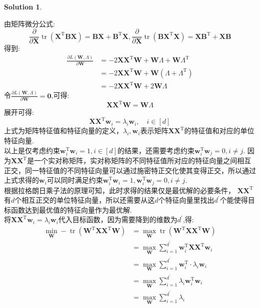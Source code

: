 \documentclass[a4paper,UTF8]{article}
\numberwithin{equation}{section}
\numberwithin{equation}{section}
\theoremstyle{definition}
\newtheorem*{solution}{Solution}
\begin{document}
\begin{solution}
\begin{enumerate}
        由矩阵微分公式:
        $$\frac{\partial}{\partial \mathbf{X}} \operatorname{tr}\left(\mathbf{X}^{\mathrm{T}} \mathbf{B} \mathbf{X}\right)=\mathbf{B} \mathbf{X}+\mathbf{B}^{\mathrm{T}} \mathbf{X}, \frac{\partial}{\partial \mathbf{X}} \operatorname{tr}\left(\mathbf{B X}^{\mathrm{T}} \mathbf{X}\right)=\mathbf{X B}^{\mathrm{T}}+\mathbf{X} \mathbf{B}$$
        得到:
        $$\begin{aligned} \frac{\partial L(\mathbf{W}, \Lambda)}{\partial \mathbf{W}} & =-2 \mathbf{X} \mathbf{X}^{\mathrm{T}} \mathbf{W}+\mathbf{W} \Lambda+\mathbf{W} \Lambda^{\mathrm{T}} \\ & =-2 \mathbf{X} \mathbf{X}^{\mathrm{T}} \mathbf{W}+\mathbf{W}\left(\Lambda+\Lambda^{\mathrm{T}}\right) \\ & =-2 \mathbf{X} \mathbf{X}^{\mathrm{T}} \mathbf{W}+2 \mathbf{W} \Lambda\end{aligned}$$
        令$\frac{\partial L(\mathbf{W}, \Lambda)}{\partial \mathbf{W}}=\mathbf{0}$,可得:
        $$\mathbf{X X}^{\mathrm{T}} \mathbf{W}=\mathbf{W} \Lambda$$
        展开可得:
        $$\mathbf{X X}^{\mathrm{T}} \boldsymbol{w}_{i}=\lambda_{i} \boldsymbol{w}_{i}, \quad i\in[d]$$
        上式为矩阵特征值和特征向量的定义，$\lambda_i, \boldsymbol{w}_i$表示矩阵$\mathbf{X X}^{\mathrm{T}}$的特征值和对应的单位特征向量. \\
        以上是仅考虑约束$\boldsymbol{w}_{i}^{\mathrm{T}} \boldsymbol{w}_{i}=1, i\in[d]$的结果，还需要考虑约束$\boldsymbol{w}_{i}^{\mathrm{T}} \boldsymbol{w}_{j}=0, i\neq j$. 因为$\mathbf{X X}^{\mathrm{T}}$是一个实对称矩阵，实对称矩阵的不同特征值所对应的特征向量之间相互正交，同一特征值的不同特征向量可以通过施密特正交化使其变得正交，所以通过上式求得的$\boldsymbol{w}_{i}$可以同时满足约束$\boldsymbol{w}_{i}^{\mathrm{T}} \boldsymbol{w}_{i}=1, \boldsymbol{w}_{i}^{\mathrm{T}} \boldsymbol{w}_{j}=0, i\neq j$. \\
        根据拉格朗日乘子法的原理可知，此时求得的结果仅是最优解的必要条件，
        $\mathbf{X X}^{\mathrm{T}}$有$d$个相互正交的单位特征向量，所以还需要从这$d$个特征向量里找出$d^{\prime}$个能使得目标函数达到最优值的特征向量作为最优解. \\
        将$\mathbf{X X}^{\mathrm{T}} \boldsymbol{w}_{i}=\lambda_{i} \boldsymbol{w}_{i}$代入目标函数，因为需要降到的维数为$d^{\prime}$,得:
        \begin{align*} \min _{\mathbf{W}}-\operatorname{tr}\left(\mathbf{W}^{\mathrm{T}} \mathbf{X} \mathbf{X}^{\mathrm{T}} \mathbf{W}\right) & =\max _{\mathbf{W}} \operatorname{tr}\left(\mathbf{W}^{\mathrm{T}} \mathbf{X X}^{\mathrm{T}} \mathbf{W}\right) \\ & =\max _{\mathbf{W}} \sum_{i=1}^{d^{\prime}} \boldsymbol{w}_{i}^{\mathrm{T}} \mathbf{X X}^{\mathrm{T}} \boldsymbol{w}_{i} \\ & =\max _{\mathbf{W}} \sum_{i=1}^{d^{\prime}} \boldsymbol{w}_{i}^{\mathrm{T}} \cdot \lambda_{i} \boldsymbol{w}_{i} \\ & =\max _{\mathbf{W}} \sum_{i=1}^{d^{\prime}} \lambda_{i} \boldsymbol{w}_{i}^{\mathrm{T}} \boldsymbol{w}_{i} \\ & =\max _{\mathbf{W}} \sum_{i=1}^{d^{\prime}} \lambda_{i}\end{align*}

\end{enumerate}
\end{solution}
\end{document}
